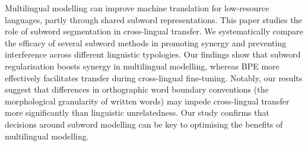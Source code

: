 Multilingual modelling can improve machine translation for low-resource languages, partly through shared subword representations. This paper studies the role of subword segmentation in cross-lingual transfer. We systematically compare the efficacy of several subword methods in promoting synergy and preventing interference across different linguistic typologies. Our findings show that subword regularisation boosts synergy in multilingual modelling, whereas BPE more effectively facilitates transfer during cross-lingual fine-tuning. Notably, our results suggest that differences in orthographic word boundary conventions (the morphological granularity of written words) may impede cross-lingual transfer more significantly than linguistic unrelatedness. Our study confirms that decisions around subword modelling can be key to optimising the benefits of multilingual modelling.